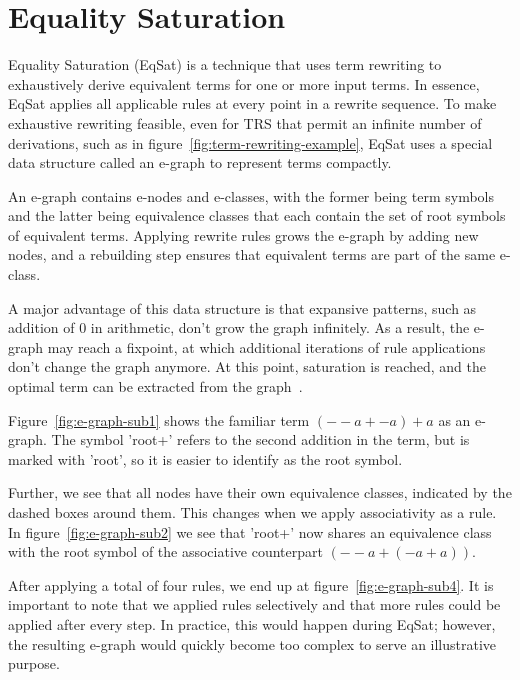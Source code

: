 \section{Equality Saturation}
\label{sec:equality-saturation}

Equality Saturation (EqSat) is a technique that uses term rewriting to exhaustively derive equivalent terms for one or more input terms. In essence, EqSat applies all applicable rules at every point in a rewrite sequence. To make exhaustive rewriting feasible, even for TRS that permit an infinite number of derivations, such as in figure~\ref{fig:term-rewriting-example}, EqSat uses a special data structure called an e-graph to represent terms compactly.

An e-graph contains e-nodes and e-classes, with the former being term symbols and the latter being equivalence classes that each contain the set of root symbols of equivalent terms. Applying rewrite rules grows the e-graph by adding new nodes, and a rebuilding step ensures that equivalent terms are part of the same e-class. 

A major advantage of this data structure is that expansive patterns, such as addition of 0 in arithmetic, don’t grow the graph infinitely. As a result, the e-graph may reach a fixpoint, at which additional iterations of rule applications don’t change the graph anymore. At this point, saturation is reached, and the optimal term can be extracted from the graph~\citep{Willsey_2021}.

Figure~\ref{fig:e-graph-sub1} shows the familiar term $(--a + -a) + a$ as an e-graph. The symbol 'root+' refers to the second addition in the term, but is marked with 'root', so it is easier to identify as the root symbol.

Further, we see that all nodes have their own equivalence classes, indicated by the dashed boxes around them. This changes when we apply associativity as a rule. In figure~\ref{fig:e-graph-sub2} we see that 'root+' now shares an equivalence class with the root symbol of the associative counterpart $(--a + (-a + a))$.

After applying a total of four rules, we end up at figure~\ref{fig:e-graph-sub4}. It is important to note that we applied rules selectively and that more rules could be applied after every step. In practice, this would happen during EqSat; however, the resulting e-graph would quickly become too complex to serve an illustrative purpose.


